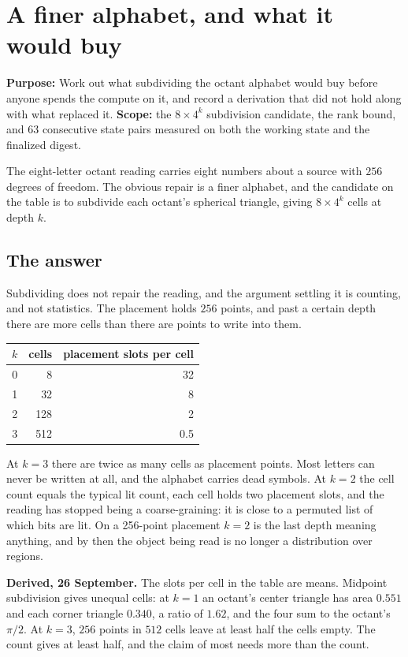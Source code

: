 \chapter{A finer alphabet, and what it would buy}

\textbf{Purpose:} Work out what subdividing the octant alphabet would buy before anyone spends the compute on it, and record a derivation that did not hold along with what replaced it. \textbf{Scope:} the \(8 \times 4^k\) subdivision candidate, the rank bound, and 63 consecutive state pairs measured on both the working state and the finalized digest.

The eight-letter octant reading carries eight numbers about a source with \(256\) degrees of freedom. The obvious repair is a finer alphabet, and the candidate on the table is to subdivide each octant's spherical triangle, giving \(8 \times 4^k\) cells at depth \(k\).

\section{The answer}

Subdividing does not repair the reading, and the argument settling it is counting, and not statistics. The placement holds \(256\) points, and past a certain depth there are more cells than there are points to write into them.

\begin{center}
\begin{tabular}{@{}rrr@{}}
\toprule
\(k\) & cells & placement slots per cell \\
\midrule
0 & 8 & 32 \\
1 & 32 & 8 \\
2 & 128 & 2 \\
3 & 512 & 0.5 \\
\bottomrule
\end{tabular}
\end{center}

At \(k = 3\) there are twice as many cells as placement points. Most letters can never be written at all, and the alphabet carries dead symbols. At \(k = 2\) the cell count equals the typical lit count, each cell holds two placement slots, and the reading has stopped being a coarse-graining: it is close to a permuted list of which bits are lit. On a 256-point placement \(k = 2\) is the last depth meaning anything, and by then the object being read is no longer a distribution over regions.

\textbf{Derived, 26 September.} The slots per cell in the table are means. Midpoint subdivision gives unequal cells: at \(k = 1\) an octant's center triangle has area \(0.551\) and each corner triangle \(0.340\), a ratio of \(1.62\), and the four sum to the octant's \(\pi/2\). At \(k = 3\), \(256\) points in \(512\) cells leave at least half the cells empty. The count gives at least half, and the claim of most needs more than the count.

